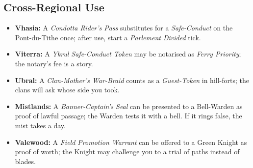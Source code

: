 \subsection*{Cross-Regional Use}
\begin{itemize}
    \item \textbf{Vhasia:} A \emph{Condotta Rider's Pass} substitutes for a \emph{Safe-Conduct} on the Pont-du-Tithe once; after use, start a \emph{Parlement Divided} tick.
    \item \textbf{Viterra:} A \emph{Ykrul Safe-Conduct Token} may be notarised as \emph{Ferry Priority}; the notary's fee is a story.
    \item \textbf{Ubral:} A \emph{Clan-Mother's War-Braid} counts as a \emph{Guest-Token} in hill-forts; the clans will ask whose side you took.
    \item \textbf{Mistlands:} A \emph{Banner-Captain's Seal} can be presented to a Bell-Warden as proof of lawful passage; the Warden tests it with a bell. If it rings false, the mist takes a day.
    \item \textbf{Valewood:} A \emph{Field Promotion Warrant} can be offered to a Green Knight as proof of worth; the Knight may challenge you to a trial of paths instead of blades.
\end{itemize}

